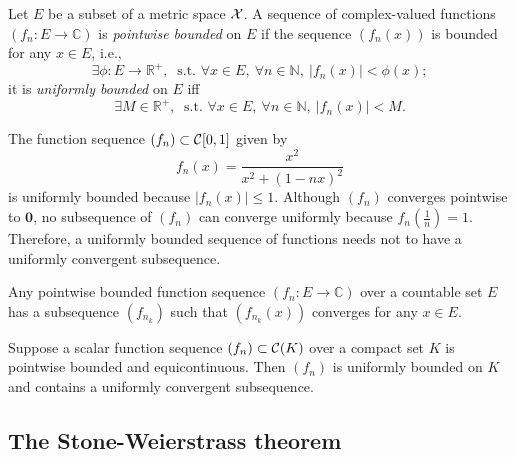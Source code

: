 \begin{defn}
  \label{eq:uniformlyBounded}
  Let $E$ be a subset of a metric space ${\cal X}$.
  A sequence of complex-valued functions $(f_n: E\rightarrow\mathbb{C})$  
  is \emph{pointwise bounded} on $E$
  if the sequence $(f_n(x))$ is bounded for any $x\in E$, i.e.,
  \begin{equation}
    \label{eq:pointwiseBounded}
    \exists \phi:E\rightarrow\mathbb{R}^+,\ \text{ s.t. } \forall x\in E,\
    \forall n\in\mathbb{N},\ |f_n(x)|<\phi(x);
  \end{equation}
  it is \emph{uniformly bounded} on $E$ iff
  \begin{equation}
    \label{eq:uniformlyBounded}
    \exists M\in \mathbb{R}^+,\ \text{ s.t. } \forall x\in E,\
    \forall n\in\mathbb{N},\ |f_n(x)|<M.
  \end{equation}
\end{defn}

\begin{exm}
  The function sequence $(f_n)\subset {\cal C}[0,1]$ given by
  \begin{displaymath}
    f_n(x)=\frac{x^2}{x^2+(1-nx)^2}
  \end{displaymath}
  is uniformly bounded because $|f_n(x)|\le 1$.
  Although $(f_n)$ converges pointwise to $\mathbf{0}$,
   no subsequence of $(f_n)$ can converge uniformly
   because $f_n(\frac{1}{n})=1$.
  Therefore, a uniformly bounded sequence of functions
   needs not to have a uniformly convergent subsequence.
\end{exm}

\begin{lem}
  \label{lem:pointwiseBoundedOnCountableSet}
  Any pointwise bounded function sequence $(f_n: E\rightarrow \mathbb{C})$
  over a countable set $E$ 
  has a subsequence $(f_{n_k})$
  such that $(f_{n_k}(x))$ converges for any $x\in E$. 
\end{lem}

\begin{thm}%
  \label{thm:AscoliSequence}
  Suppose a scalar function sequence $(f_n)\subset {\cal C}(K)$
  over a compact set $K$ is pointwise bounded and equicontinuous.
  Then $(f_n)$ is uniformly bounded on $K$
  and contains a uniformly convergent subsequence.
\end{thm}

\subsection{The Stone-Weierstrass theorem}

